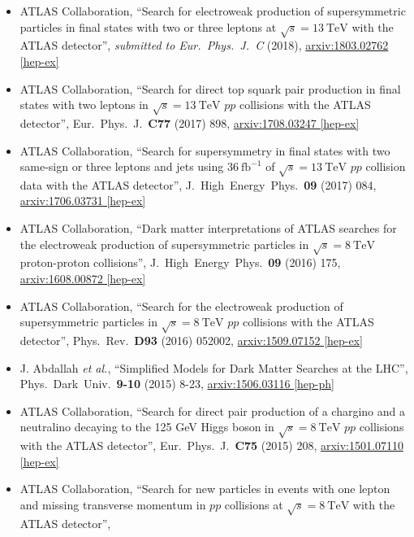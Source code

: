 \documentclass[a4paper,10pt]{article}
\begin{document}
\begin{itemize}
	\item ATLAS Collaboration,
	``Search for electroweak production of supersymmetric particles in final states with two or three leptons at $\sqrt{s}=13\ \mathrm{TeV}$ with the ATLAS detector'',
	{\it submitted to Eur.\ Phys.\ J.\ C} (2018),
	\href{https://arxiv.org/abs/1803.02762}{arxiv:1803.02762 [hep-ex]}	
	\item ATLAS Collaboration,
	``Search for direct top squark pair production in final states with two leptons in $\sqrt{s}=13\ \mathrm{TeV}$ $pp$ collisions with the ATLAS detector'',
	Eur.\ Phys.\ J.\ {\bf C77} (2017) 898,
	\href{https://arxiv.org/abs/1708.03247}{arxiv:1708.03247 [hep-ex]}
	\item ATLAS Collaboration,
	``Search for supersymmetry in final states with two same-sign or three leptons and jets using $36\ \mathrm{fb}^{-1}$ of $\sqrt{s}=13\ \mathrm{TeV}$ $pp$ collision data with the ATLAS detector'',
	J.\ High\ Energy\ Phys.\ {\bf 09} (2017) 084,
	\href{https://arxiv.org/abs/1706.03731}{arxiv:1706.03731 [hep-ex]}
	\item ATLAS Collaboration,
	``Dark matter interpretations of ATLAS searches for the electroweak production of supersymmetric particles in $\sqrt{s} = 8\ \mathrm{TeV}$ proton-proton collisions'',
	J.\ High\ Energy\ Phys.\ {\bf 09} (2016) 175,
	\href{http://arxiv.org/abs/1608.00872}{arxiv:1608.00872 [hep-ex]}
	\item ATLAS Collaboration,
	``Search for the electroweak production of supersymmetric particles in $\sqrt{s} = 8\ \mathrm{TeV}$ $pp$ collisions with the ATLAS detector'',
	Phys.\ Rev.\ {\bf D93} (2016) 052002,
	\href{http://arxiv.org/abs/1509.07152}{arxiv:1509.07152 [hep-ex]}
	\item J. Abdallah {\it et al.},
	``Simplified Models for Dark Matter Searches at the LHC'',
	Phys.\ Dark\ Univ.\ {\bf 9-10} (2015) 8-23,
	\href{http://arxiv.org/abs/1506.03116}{arxiv:1506.03116 [hep-ph]}
	\item ATLAS Collaboration,
	``Search for direct pair production of a chargino and a neutralino decaying to the 125 GeV Higgs boson in $\sqrt{s} = 8\ \mathrm{TeV}$ $pp$ collisions with the ATLAS detector'',
	Eur.\ Phys.\ J.\ {\bf C75} (2015) 208,
	\href{http://arxiv.org/abs/1501.07110}{arxiv:1501.07110 [hep-ex]}
	\item ATLAS Collaboration,
	``Search for new particles in events with one lepton and missing transverse momentum in $pp$ collisions at $\sqrt{s} = 8\ \mathrm{TeV}$ with the ATLAS detector'',

\end{itemize}
\end{document}
